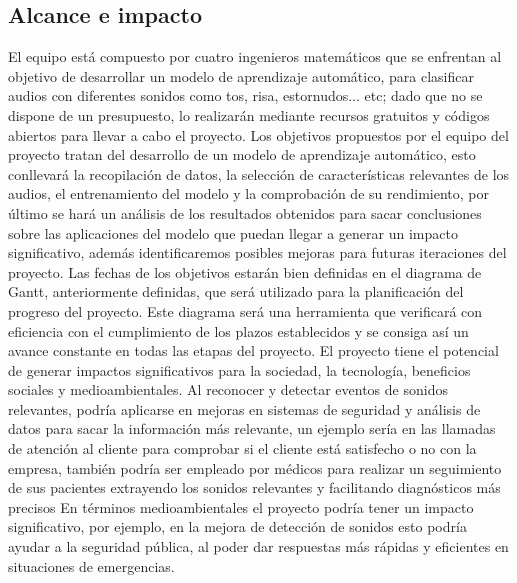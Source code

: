 \subsection{Alcance e impacto}
El equipo está compuesto por cuatro ingenieros matemáticos que se enfrentan al objetivo de desarrollar un modelo de aprendizaje automático, para clasificar audios con diferentes sonidos como tos, risa, estornudos... etc; dado que no se dispone de un presupuesto, lo realizarán mediante recursos gratuitos y códigos abiertos para llevar a cabo el proyecto.
Los objetivos propuestos por el equipo del proyecto tratan del desarrollo de un modelo de aprendizaje automático, esto conllevará la recopilación de datos, la selección de características relevantes de los audios, el entrenamiento del modelo y la comprobación de su rendimiento, por último se hará un análisis de los resultados obtenidos para sacar conclusiones sobre las aplicaciones del modelo que puedan llegar a generar un impacto significativo, además identificaremos posibles mejoras para futuras iteraciones
del proyecto.
Las fechas de los objetivos estarán bien definidas en el diagrama de Gantt, anteriormente definidas, que será utilizado para la planificación del progreso del proyecto. Este diagrama será una herramienta que verificará con eficiencia con el cumplimiento de los plazos establecidos y se consiga así un avance constante en todas las etapas del proyecto.
El proyecto tiene el potencial de generar impactos significativos para la sociedad, la tecnología, beneficios sociales y medioambientales. Al reconocer y detectar eventos de sonidos relevantes, podría aplicarse en mejoras en sistemas de seguridad y análisis de datos para sacar la información más relevante, un ejemplo sería en las llamadas de atención al cliente para comprobar si el cliente está satisfecho o no con la empresa, también podría ser empleado por médicos para realizar un seguimiento de sus pacientes extrayendo los sonidos relevantes y facilitando diagnósticos más precisos
En términos medioambientales el proyecto podría tener un impacto significativo, por ejemplo, en la mejora de detección de sonidos esto podría ayudar a la seguridad pública, al poder dar respuestas más rápidas y eficientes en situaciones de emergencias.
